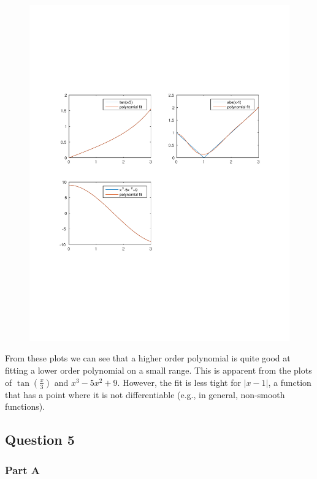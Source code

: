 \begin{figure}[th]
  \centering
\includegraphics[trim=10mm 70mm 10mm 70mm, width=1.0\textwidth]{../q4_plots}
\end{figure}

From these plots we can see that a higher order polynomial is quite good at fitting a lower order polynomial on a small range.
This is apparent from the plots of \(\tan(\frac{x}{3})\) and \(x^{3}-5x^{2}+9\).
However, the fit is less tight for \(|x-1|\), a function that has a point where it is not differentiable (e.g., in general, non-smooth functions).

\newpage


\newpage
\subsection{Question 5}
\subsubsection{Part A}

